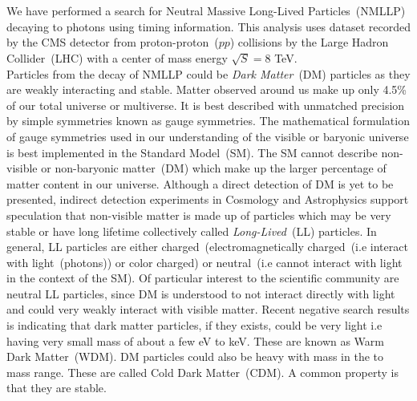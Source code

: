 \paragraph*{} \mbox{}\\
We have performed a search for Neutral Massive Long-Lived Particles~(NMLLP) decaying to photons using timing information. This analysis uses dataset recorded by the CMS detector from proton-proton~(\textbf{$pp$}) collisions by  the Large Hadron Collider~(LHC) with a center of mass energy  $\sqrt{S} = 8 $ TeV.
\mbox{}\\
Particles from the decay of NMLLP could be \textit{Dark Matter}~(DM) particles as they are weakly interacting and stable.
Matter observed around us make up only 4.5\% of our total universe or multiverse. It is best described with unmatched precision by simple symmetries known as gauge symmetries. The mathematical formulation of gauge symmetries used in our understanding of the visible or baryonic universe is best implemented in the Standard Model~(SM). The SM cannot describe non-visible or non-baryonic matter~(DM) which make up the larger percentage of matter content in our universe. Although a direct detection of DM is yet to be presented, indirect detection experiments in Cosmology and Astrophysics support speculation that non-visible matter is made up of particles which may be very stable or have long lifetime collectively called \textit{Long-Lived}~(LL) particles.  In general, LL particles are either charged~(electromagnetically charged~(i.e interact with light~(photons)) or color charged) or neutral~(i.e cannot interact with light in the context of the SM).
\newline
Of particular interest to the scientific community are neutral LL particles, since DM is understood to not interact directly with light and could very weakly interact with visible matter.  Recent negative search results is indicating that dark matter particles, if they exists, could be very light i.e having very small mass of about a few eV to keV. These are known as Warm Dark Matter~(WDM). DM particles could also be heavy with mass in the \GeV to \TeV mass range. These are called Cold Dark Matter~(CDM). A common  property is that they are stable.

